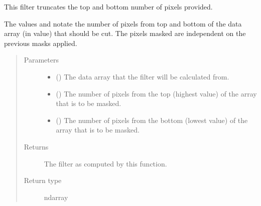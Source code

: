 \documentclass[letterpaper,10pt,english]{sphinxmanual}
\begin{document}

\begin{fulllineitems}
\label{\detokenize{docstrings/ifa_smeargle.masking.filters:ifa_smeargle.masking.filters.filter_pixel_truncation}}
This filter truncates the top and bottom number of pixels
provided.

The values  and  notate the number
of pixels from top and bottom of the data array (in value) that
should be cut. The pixels masked are independent on the
previous masks applied.
\begin{quote}\begin{description}
\item[{Parameters}] \leavevmode\begin{itemize}
\item {} 
 () \textendash{} The data array that the filter will be calculated from.

\item {} 
 () \textendash{} The number of pixels from the top (highest value) of the
array that is to be masked.

\item {} 
 () \textendash{} The number of pixels from the bottom (lowest value) of the
array that is to be masked.

\end{itemize}

\item[{Returns}] \leavevmode
{} \textendash{} The filter as computed by this function.

\item[{Return type}] \leavevmode
ndarray

\end{description}\end{quote}

\end{fulllineitems}
\end{document}
